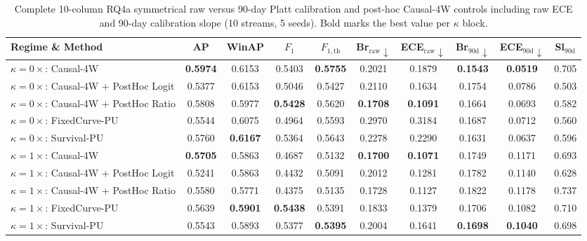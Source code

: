 \documentclass[10pt,a4paper]{article}
\begin{document}
\begin{table}[!htbp]
\centering
\caption{Complete 10-column RQ4a symmetrical raw versus 90-day Platt calibration and post-hoc Causal-4W controls including raw ECE and 90-day calibration slope (10 streams, 5 seeds). Bold marks the best value per $\kappa$ block.}
\label{tab:or_rq4a_posthoc_full}
\fontsize{7.5}{9.0}\selectfont
\setlength{\tabcolsep}{1.8pt}
\begin{tabular*}{\textwidth}{@{\extracolsep\fill}lccccccccc@{}}
\toprule
\textbf{Regime \& Method} & \textbf{AP} & \textbf{WinAP} & \textbf{$F_1$} & \textbf{$F_{1,\mathrm{th}}$} & \textbf{Br$_{\mathrm{raw}}\downarrow$} & \textbf{ECE$_{\mathrm{raw}}\downarrow$} & \textbf{Br$_{90\mathrm{d}}\downarrow$} & \textbf{ECE$_{90\mathrm{d}}\downarrow$} & \textbf{Sl$_{90\mathrm{d}}$} \\
\midrule
$\kappa=0\times$: Causal-4W & \textbf{0.5974} & 0.6153 & 0.5403 & \textbf{0.5755} & 0.2021 & 0.1879 & \textbf{0.1543} & \textbf{0.0519} & 0.705 \\
$\kappa=0\times$: Causal-4W + PostHoc Logit & 0.5377 & 0.6153 & 0.5046 & 0.5427 & 0.2110 & 0.1634 & 0.1754 & 0.0786 & 0.503 \\
$\kappa=0\times$: Causal-4W + PostHoc Ratio & 0.5808 & 0.5977 & \textbf{0.5428} & 0.5620 & \textbf{0.1708} & \textbf{0.1091} & 0.1664 & 0.0693 & 0.582 \\
$\kappa=0\times$: FixedCurve-PU & 0.5544 & 0.6075 & 0.4964 & 0.5593 & 0.2970 & 0.3184 & 0.1687 & 0.0712 & 0.560 \\
$\kappa=0\times$: Survival-PU & 0.5760 & \textbf{0.6167} & 0.5364 & 0.5643 & 0.2278 & 0.2290 & 0.1631 & 0.0637 & 0.596 \\
\midrule
$\kappa=1\times$: Causal-4W & \textbf{0.5705} & 0.5863 & 0.4687 & 0.5132 & \textbf{0.1700} & \textbf{0.1071} & 0.1749 & 0.1171 & 0.693 \\
$\kappa=1\times$: Causal-4W + PostHoc Logit & 0.5241 & 0.5863 & 0.4432 & 0.5091 & 0.2012 & 0.1281 & 0.1782 & 0.1140 & 0.628 \\
$\kappa=1\times$: Causal-4W + PostHoc Ratio & 0.5580 & 0.5771 & 0.4375 & 0.5135 & 0.1728 & 0.1127 & 0.1822 & 0.1178 & 0.737 \\
$\kappa=1\times$: FixedCurve-PU & 0.5639 & \textbf{0.5901} & \textbf{0.5438} & 0.5391 & 0.1833 & 0.1379 & 0.1706 & 0.1082 & 0.710 \\
$\kappa=1\times$: Survival-PU & 0.5543 & 0.5893 & 0.5377 & \textbf{0.5395} & 0.2004 & 0.1641 & \textbf{0.1698} & \textbf{0.1040} & 0.698 \\

\end{tabular*}
\end{table}
\end{document}

